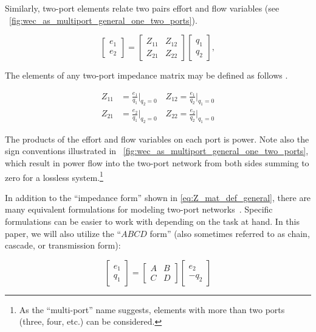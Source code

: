 \documentclass[lettersize,journal]{IEEEtran}
\begin{document}
\noindent{}Similarly, two-port elements relate two pairs effort and flow variables (see \figurename~\ref{fig:wec_as_multiport_general_one_two_ports}).

\begin{equation} \label{eq:Z_mat_def_general}
        \begin{bmatrix} e_1 \\ e_2 \end{bmatrix} = \begin{bmatrix} Z_{11} & Z_{12} \\ Z_{21} & Z_{22} \end{bmatrix} \begin{bmatrix} q_1 \\ q_2 \end{bmatrix},
\end{equation}

\noindent{}The elements of any two-port impedance matrix may be defined as follows \cite{Frickey:1994aa}.

\begin{equation} \label{eq:Z_mat_elements_def}
        \begin{aligned}
                Z_{11}& = \frac{e_1}{q_1} \bigg \vert_{q_2=0} \quad
                Z_{12} = \frac{e_1}{q_2} \bigg \vert_{q_1=0}  \\[1em]
                Z_{21}& = \frac{e_2}{q_1} \bigg \vert_{q_2=0} \quad
                Z_{22} = \frac{e_2}{q_2} \bigg \vert_{q_1=0} 
        \end{aligned}
\end{equation}

\noindent{}The products of the effort and flow variables on each port is power.
Note also the sign conventions illustrated in \figurename~\ref{fig:wec_as_multiport_general_one_two_ports}, which result in power flow into the two-port network from both sides summing to zero for a lossless system.\footnote{As the ``multi-port'' name suggests, elements with more than two ports (three, four, etc.) can be considered.}

In addition to the ``impedance form'' shown in \eqref{eq:Z_mat_def_general}, there are many equivalent formulations for modeling two-port networks~\cite{Frickey:1994aa}.
Specific formulations can be easier to work with depending on the task at hand.
In this paper, we will also utilize the ``$ABCD$ form'' (also sometimes referred to as chain, cascade, or transmission form):

\begin{equation}
        \label{eq:abcd_mat_def_general}
        \begin{bmatrix} e_1 \\ q_1 \end{bmatrix}
        = 
        \begin{bmatrix} A & B \\ C & D \end{bmatrix}
        \begin{bmatrix} e_2 \\ - q_2 \end{bmatrix}
\end{equation}
\end{document}
